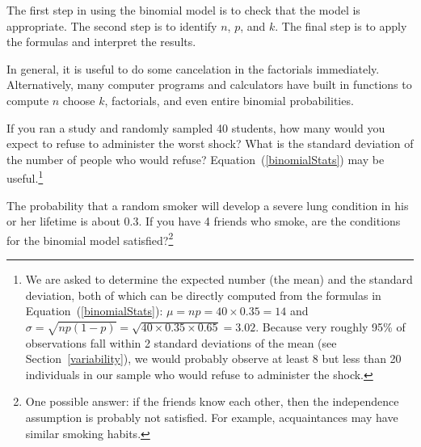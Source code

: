 \begin{tipBox}{
The first step in using the binomial model is to check that the model is appropriate. The second step is to identify $n$, $p$, and $k$. The final step is to apply the formulas and interpret the results.}
\end{tipBox}

\begin{tipBox}{
In general, it is useful to do some cancelation in the factorials immediately. Alternatively, many computer programs and calculators have built in functions to compute $n$ choose $k$, factorials, and even entire binomial probabilities.}
\end{tipBox}

\begin{exercise}
If you ran a study and randomly sampled 40 students, how many would you expect to refuse to administer the worst shock? What is the standard deviation of the number of people who would refuse? Equation~(\ref{binomialStats}) may be useful.\footnote{We are asked to determine the expected number (the mean) and the standard deviation, both of which can be directly computed from the formulas in Equation~(\ref{binomialStats}): $\mu=np = 40\times 0.35 = 14$ and $\sigma = \sqrt{np(1-p)} = \sqrt{40\times 0.35\times 0.65} = 3.02$. Because very roughly 95\% of observations fall within 2 standard deviations of the mean (see Section~\ref{variability}), we would probably observe at least 8 but less than 20 individuals in our sample who would refuse to administer the shock.}
\end{exercise}

\begin{exercise}
The probability that a random smoker will develop a severe lung condition in his or her lifetime is about $0.3$. If you have 4 friends who smoke, are the conditions for the binomial model satisfied?\footnote{One possible answer: if the friends know each other, then the independence assumption is probably not satisfied. For example, acquaintances may have similar smoking habits.}
\end{exercise}


